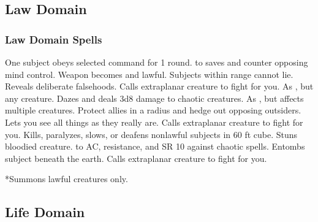 \subsection{Law Domain}

\subsubsection{Law Domain Spells}
\begin{spelllist}
 One subject obeys selected command for 1 round.
  to saves and counter opposing mind control.
 Weapon becomes  and lawful.
 Subjects within range cannot lie.
 Reveals deliberate falsehoods.
 Calls extraplanar creature to fight for you.
 As , but any creature.
 Dazes and deals 3d8 damage to chaotic creatures.
 As , but affects multiple creatures.
 Protect allies in a \areamed radius and hedge out opposing outsiders.
\M Lets you see all things as they really are.
 Calls extraplanar creature to fight for you.
 Kills, paralyzes, slows, or deafens nonlawful subjects in 60 ft cube.
 Stuns bloodied creature.
\spellhead[8]{}
\F {} to AC,  resistance, and SR 10 against chaotic spells.
 Entombs subject beneath the earth.
 Calls extraplanar creature to fight for you.
\end{spelllist}
*Summons lawful creatures only.

\subsection{Life Domain}

